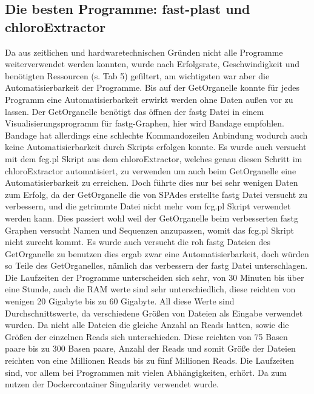 \documentclass{scrartcl}
\begin{document}
\subsection{Die besten Programme: fast-plast und chloroExtractor}
\label{sec-4-5}
Da aus zeitlichen und hardwaretechnischen Gründen nicht alle Programme weiterverwendet werden konnten, wurde nach Erfolgsrate, Geschwindigkeit und benötigten Ressourcen (s. Tab 5)
gefiltert, am wichtigsten war aber die Automatisierbarkeit der Programme. Bis auf der GetOrganelle konnte für jedes Programm eine Automatisierbarkeit
erwirkt werden ohne Daten außen vor zu lassen. Der GetOrganelle benötigt das öffnen der fastg Datei in einem Visualisierungsprogramm für fastg-Graphen, hier wird Bandage empfohlen.
Bandage hat allerdings eine schlechte Kommandozeilen Anbindung wodurch auch keine Automatisierbarkeit durch Skripts erfolgen konnte.
Es wurde auch versucht mit dem fcg.pl Skript aus dem chloroExtractor, welches genau diesen Schritt im chloroExtractor automatisiert, zu verwenden um auch beim
GetOrganelle eine Automatisierbarkeit zu erreichen. Doch führte dies nur bei sehr wenigen Daten zum Erfolg, da der GetOrganelle die von SPAdes erstellte 
fastg Datei versucht zu verbessern, und die getrimmte Datei nicht mehr vom fcg.pl Skript verwendet werden kann. Dies passiert wohl weil der GetOrganelle beim verbesserten
fastg Graphen versucht Namen und Sequenzen anzupassen, womit das fcg.pl Skript nicht zurecht kommt. Es wurde auch versucht die roh fastg Dateien des GetOrganelle zu benutzen
dies ergab zwar eine Automatisierbarkeit, doch würden so Teile des GetOrganelles, nämlich das verbessern der fastg Datei unterschlagen.
Die Laufzeiten der Programme unterscheiden sich sehr, von 30 Minuten bis über eine Stunde, auch die RAM werte sind sehr unterschiedlich, diese
reichten von wenigen 20 Gigabyte bis zu 60 Gigabyte. All diese Werte sind Durchschnittswerte, da verschiedene Größen von Dateien als Eingabe verwendet wurden. Da nicht alle
Dateien die gleiche Anzahl an Reads hatten, sowie die Größen der einzelnen Reads sich unterschieden. Diese reichten von 75 Basen paare bis zu 300 Basen paare, Anzahl der Reads
und somit Größe der Dateien reichten von eine Millionen Reads bis zu fünf Millionen Reads. Die Laufzeiten sind, vor allem bei Programmen mit vielen Abhängigkeiten, erhört. Da zum nutzen
der Dockercontainer Singularity \footnotemark[53]{} verwendet wurde.    
\end{document}

